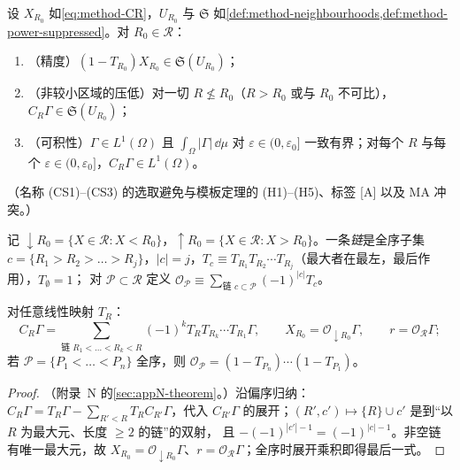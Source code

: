 \begin{definition}[减除条件 (CS1)--(CS3)]\label{def:method-collins-conditions}
设 $X_{R_0}$ 如\cref{eq:method-CR}，$U_{R_0}$ 与 $\mathfrak S$ 如\cref{def:method-neighbourhoods,def:method-power-suppressed}。对 $R_0\in\mathcal R$：
\begin{enumerate}[leftmargin=4.4em,labelwidth=4em,itemsep=1pt,topsep=2pt]
\item[\textbf{(CS1)}$_{R_0}$]（精度）$(1-T_{R_0})X_{R_0}\in\mathfrak S(U_{R_0})$；
\item[\textbf{(CS2)}$_{R_0}$]（非较小区域的压低）对一切 $R\not\le R_0$（$R>R_0$ 或与 $R_0$ 不可比），$C_R\Gamma\in\mathfrak S(U_{R_0})$；
\item[\textbf{(CS3)}]（可积性）$\Gamma\in L^1(\Omega)$ 且 $\int_\Omega|\Gamma|\,\dd\mu$ 对 $\varepsilon\in(0,\varepsilon_0]$ 一致有界；对每个 $R$ 与每个 $\varepsilon\in(0,\varepsilon_0]$，$C_R\Gamma\in L^1(\Omega)$。
\end{enumerate}
（名称 (CS1)--(CS3) 的选取避免与模板定理的 (H1)--(H5)、标签 [A] 以及 MA 冲突。）
\end{definition}

记 $\downarrow R_0=\{X\in\mathcal R:X<R_0\}$，$\uparrow R_0=\{X\in\mathcal R:X>R_0\}$。一条\emph{链}是全序子集 $c=\{R_1>R_2>\dots>R_j\}$，$|c|=j$，$T_c\equiv T_{R_1}T_{R_2}\cdots T_{R_j}$（最大者在最左，最后作用），$T_\emptyset=1$；
对 $\mathcal P\subset\mathcal R$ 定义 $\mathcal O_{\mathcal P}\equiv\sum_{\text{链 }c\subset\mathcal P}(-1)^{|c|}T_c$。

\begin{proposition}[减除的链展开]\label{prop:method-chains}
对任意线性映射 $T_R$：
\begin{equation}\label{eq:method-chains}
C_R\Gamma=\sum_{\text{链 }R_1<\dots<R_k<R}(-1)^kT_RT_{R_k}\cdots T_{R_1}\Gamma,\qquad X_{R_0}=\mathcal O_{\downarrow R_0}\Gamma,\qquad r=\mathcal O_{\mathcal R}\Gamma ;
\end{equation}
若 $\mathcal P=\{P_1<\dots<P_n\}$ 全序，则 $\mathcal O_{\mathcal P}=(1-T_{P_n})\cdots(1-T_{P_1})$。
\end{proposition}

\begin{proof}
（附录~N 的\cref{sec:appN-theorem}。）沿偏序归纳：$C_R\Gamma=T_R\Gamma-\sum_{R'<R}T_RC_{R'}\Gamma$，代入 $C_{R'}\Gamma$ 的展开；$(R',c')\mapsto\{R\}\cup c'$ 是到“以 $R$ 为最大元、长度 $\ge2$ 的链”的双射，
且 $-(-1)^{|c'|-1}=(-1)^{|c|-1}$。非空链有唯一最大元，故 $X_{R_0}=\mathcal O_{\downarrow R_0}\Gamma$、$r=\mathcal O_{\mathcal R}\Gamma$；全序时展开乘积即得最后一式。
\end{proof}

